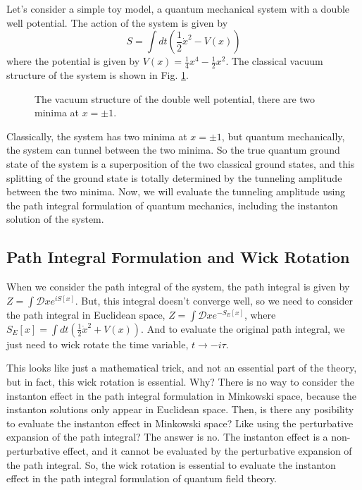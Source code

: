 \documentclass{article}
\begin{document}
Let's consider a simple toy model, a quantum mechanical system with a double well potential. The action of the system is given by
\begin{equation}
    S = \int dt \left( \frac{1}{2} \dot{x}^2 - V(x) \right)
\end{equation}
where the potential is given by $V(x) = \frac{1}{4}x^4 - \frac{1}{2}x^2$.
The classical vacuum structure of the system is shown in Fig. \ref{fig:doublewell}.
\begin{figure}[h]
    \centering
    \caption{The vacuum structure of the double well potential, there are two minima at $x = \pm 1$.}
    \label{fig:doublewell}
\end{figure}

Classically, the system has two minima at $x = \pm 1$, but quantum mechanically, the system can tunnel between the two minima.
So the true quantum ground state of the system is a superposition of the two classical ground states, and this splitting of the ground state is totally determined by the tunneling amplitude between the two minima.
Now, we will evaluate the tunneling amplitude using the path integral formulation of quantum mechanics, including the instanton solution of the system. 




\subsection{Path Integral Formulation and Wick Rotation}


When we consider the path integral of the system, the path integral is given by $Z = \int \mathcal{D}x e^{iS[x]}$.
But, this integral doesn't converge well, so we need to consider the path integral in Euclidean space, $Z = \int \mathcal{D}x e^{-S_E[x]}$, where $S_E[x] = \int dt \left( \frac{1}{2} \dot{x}^2 + V(x) \right)$.
And to evaluate the original path integral, we just need to wick rotate the time variable, $t \rightarrow -i\tau$.

This looks like just a mathematical trick, and not an essential part of the theory, but in fact, this wick rotation is essential.
Why? There is no way to consider the instanton effect in the path integral formulation in Minkowski space, because the instanton solutions only appear in Euclidean space.
Then, is there any posibility to evaluate the instanton effect in Minkowski space? Like using the perturbative expansion of the path integral? The answer is no. The instanton effect is a non-perturbative effect, and it cannot be evaluated by the perturbative expansion of the path integral.
So, the wick rotation is essential to evaluate the instanton effect in the path integral formulation of quantum field theory.
\end{document}
